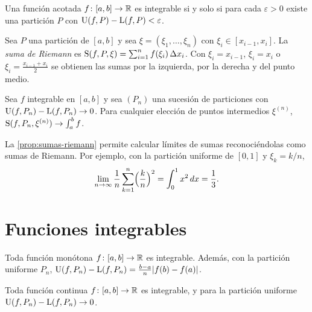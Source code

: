 \begin{teorema}\label{teo:criterio}
Una función acotada $f\colon[a,b]\to\mathbb{R}$ es integrable si y solo si para cada $\varepsilon>0$ existe una partición $P$ con $\operatorname{U}(f,P)-\operatorname{L}(f,P)<\varepsilon$.
\end{teorema}

\addtocounter{definicion}{1}%

\addtocounter{definicion}{1}%

\begin{definicion}\label{def:suma-riemann}
Sea $P$ una partición de $[a,b]$ y sea $\xi=(\xi_1,\dots,\xi_n)$ con $\xi_i\in[x_{i-1},x_i]$. La \emph{suma de Riemann} es $\operatorname{S}(f,P,\xi)=\sum_{i=1}^{n}f(\xi_i)\,\Delta x_i$. Con $\xi_i=x_{i-1}$, $\xi_i=x_i$ o $\xi_i=\frac{x_{i-1}+x_i}{2}$ se obtienen las sumas por la izquierda, por la derecha y del punto medio.
\end{definicion}

\begin{proposicion}\label{prop:sumas-riemann}
Sea $f$ integrable en $[a,b]$ y sea $(P_n)$ una sucesión de particiones con $\operatorname{U}(f,P_n)-\operatorname{L}(f,P_n)\to0$. Para cualquier elección de puntos intermedios $\xi^{(n)}$, $\operatorname{S}(f,P_n,\xi^{(n)})\to\int_a^b f$.
\end{proposicion}

La \cref{prop:sumas-riemann} permite calcular límites de sumas reconociéndolas como sumas de Riemann. Por ejemplo, con la partición uniforme de $[0,1]$ y $\xi_k=k/n$,
\[
\lim_{n\to\infty}\frac1n\sum_{k=1}^{n}\Bigl(\frac{k}{n}\Bigr)^{2}=\int_0^1x^{2}\mathop{}\!d x=\frac13 .
\]

\section{Funciones integrables}

\begin{teorema}\label{teo:monotona}
Toda función monótona $f\colon[a,b]\to\mathbb{R}$ es integrable. Además, con la partición uniforme $P_n$, $\operatorname{U}(f,P_n)-\operatorname{L}(f,P_n)=\frac{b-a}{n}\lvert f(b)-f(a)\rvert$.
\end{teorema}

\begin{teorema}\label{teo:continua}
Toda función continua $f\colon[a,b]\to\mathbb{R}$ es integrable, y para la partición uniforme $\operatorname{U}(f,P_n)-\operatorname{L}(f,P_n)\to0$.
\end{teorema}

